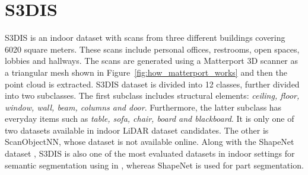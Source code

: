 \section{S3DIS}
\label{sec:dataset_s3dis}
S3DIS is an indoor dataset with scans from three different buildings covering 6020 square meters.
These scans include personal offices, restrooms, open spaces, lobbies and hallways.
The scans are generated using a Matterport 3D scanner as a triangular mesh shown in Figure~\ref{fig:how_matterport_works} and then the point cloud is extracted.
S3DIS dataset is divided into 12 classes, further divided into two subclasses.
The first subclass includes structural elements: \textit{ceiling, floor, window, wall, beam, columns and door}.
Furthermore, the latter subclass has everyday items such as \textit{table, sofa, chair, board and blackboard}.
It is only one of two datasets available in indoor LiDAR dataset candidates. 
The other is ScanObjectNN, whose dataset is not available online.
Along with the ShapeNet dataset \cite{chang2015shapenet}, S3DIS is also one of the most evaluated datasets in indoor settings for semantic segmentation using in \cite{Armeni_2016_CVPR_S3DIS}, whereas ShapeNet is used for part segmentation.
